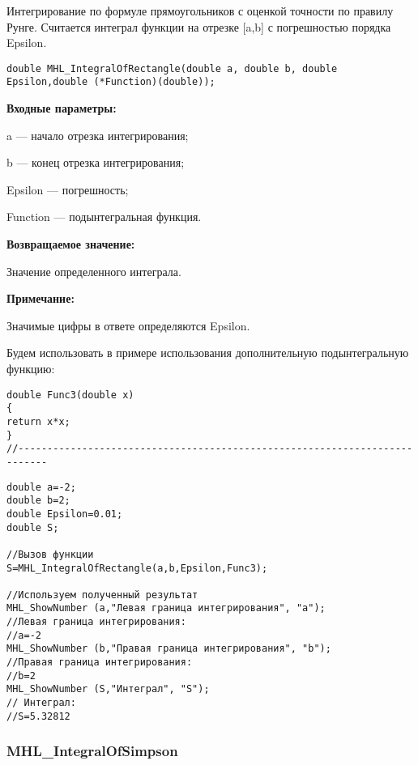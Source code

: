 \documentclass[a4paper,12pt]{article}
\begin{document}
Интегрирование по формуле прямоугольников с оценкой точности по правилу Рунге. Считается интеграл функции на отрезке [a,b] с погрешностью порядка Epsilon.


\begin{lstlisting}[label=code_syntax_MHL_IntegralOfRectangle,caption=Синтаксис]
double MHL_IntegralOfRectangle(double a, double b, double Epsilon,double (*Function)(double));
\end{lstlisting}

\textbf{Входные параметры:}

 a --- начало отрезка интегрирования;
 
 b --- конец отрезка интегрирования;
 
 Epsilon --- погрешность;
 
 Function --- подынтегральная функция.

\textbf{Возвращаемое значение:}
 
 Значение определенного интеграла.
 
 \textbf{Примечание:}
 
 Значимые цифры в ответе определяются Epsilon.

Будем использовать в примере использования дополнительную подынтегральную функцию:

\begin{lstlisting}[caption=Дополнительная функция]
double Func3(double x)
{
return x*x;
}
//---------------------------------------------------------------------------
\end{lstlisting}


\begin{lstlisting}[label=code_use_MHL_IntegralOfRectangle,caption=Пример использования]
double a=-2;
double b=2;
double Epsilon=0.01;
double S;

//Вызов функции
S=MHL_IntegralOfRectangle(a,b,Epsilon,Func3);

//Используем полученный результат
MHL_ShowNumber (a,"Левая граница интегрирования", "a");
//Левая граница интегрирования:
//a=-2
MHL_ShowNumber (b,"Правая граница интегрирования", "b");
//Правая граница интегрирования:
//b=2
MHL_ShowNumber (S,"Интеграл", "S");
// Интеграл:
//S=5.32812
\end{lstlisting}

\subsubsection{MHL\_IntegralOfSimpson}\label{MHL_IntegralOfSimpson}
\end{document}
